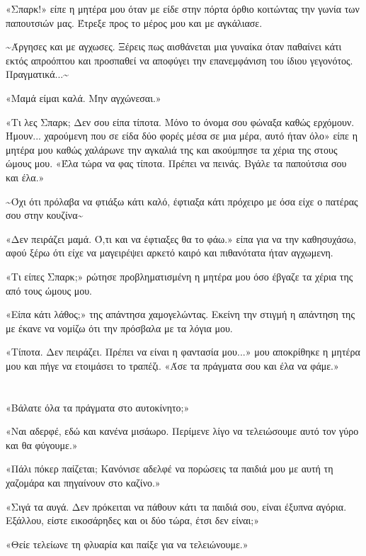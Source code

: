 \documentclass[12pt,twoside, openany]{book}
\begin{document}
«Σπαρκ!» είπε η μητέρα μου όταν με είδε στην πόρτα όρθιο κοιτώντας την γωνία των παπουτσιών μας. Έτρεξε προς το μέρος μου και με αγκάλιασε.

\textasciitilde Άργησες και με αγχωσες. Ξέρεις πως αισθάνεται μια γυναίκα όταν παθαίνει κάτι εκτός απροόπτου και προσπαθεί να αποφύγει την επανεμφάνιση του ίδιου γεγονότος. Πραγματικά...\textasciitilde 

«Μαμά είμαι καλά. Μην αγχώνεσαι.»

«Τι λες Σπαρκ; Δεν σου είπα τίποτα. Μόνο το όνομα σου φώναξα καθώς ερχόμουν. Ήμουν... χαρούμενη που σε είδα δύο φορές μέσα σε μια μέρα, αυτό ήταν όλο» είπε η μητέρα μου καθώς χαλάρωνε την αγκαλιά της και ακούμπησε τα χέρια της στους ώμους μου. «Έλα τώρα να φας τίποτα. Πρέπει να πεινάς. Βγάλε τα παπούτσια σου και έλα.»

\textasciitilde Όχι ότι πρόλαβα να φτιάξω κάτι καλό, έφτιαξα κάτι πρόχειρο με όσα είχε ο πατέρας σου στην κουζίνα\textasciitilde 

«Δεν πειράζει μαμά. Ό,τι και να έφτιαξες θα το φάω.» είπα για να την καθησυχάσω, αφού ξέρω ότι είχε να μαγειρέψει αρκετό καιρό και πιθανότατα ήταν αγχωμενη.

«Τι είπες Σπαρκ;» ρώτησε προβληματισμένη η μητέρα μου όσο έβγαζε τα χέρια της από τους ώμους μου. 

«Είπα κάτι λάθος;» της απάντησα χαμογελώντας. Εκείνη την στιγμή η απάντηση της με έκανε να νομίζω ότι την πρόσβαλα με τα λόγια μου.

«Τίποτα. Δεν πειράζει. Πρέπει να είναι η φαντασία μου...» μου αποκρίθηκε η μητέρα μου και πήγε να ετοιμάσει το τραπέζι. «Άσε τα πράγματα σου και έλα να φάμε.»

\chapter{}

«Βάλατε όλα τα πράγματα στο αυτοκίνητο;»

«Ναι αδερφέ, εδώ και κανένα μισάωρο. Περίμενε λίγο να τελειώσουμε αυτό τον γύρο και θα φύγουμε.»

«Πάλι πόκερ παίζεται; Κανόνισε αδελφέ να πορώσεις τα παιδιά μου με αυτή τη χαζομάρα και πηγαίνουν στο καζίνο.»

«Σιγά τα αυγά. Δεν πρόκειται να πάθουν κάτι τα παιδιά σου, είναι έξυπνα αγόρια. Εξάλλου, είστε εικοσάρηδες και οι δύο τώρα, έτσι δεν είναι;»

«Θείε τελείωνε τη φλυαρία και παίξε για να τελειώνουμε.»
\end{document}
